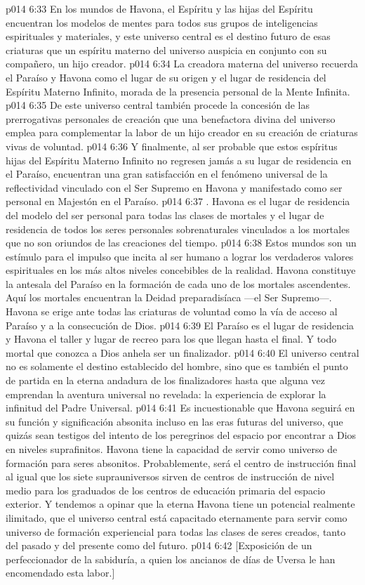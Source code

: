 \vs p014 6:33 En los mundos de Havona, el Espíritu y las hijas del Espíritu encuentran los modelos de mentes para todos sus grupos de inteligencias espirituales y materiales, y este universo central es el destino futuro de esas criaturas que un espíritu materno del universo auspicia en conjunto con su compañero, un hijo creador.
\vs p014 6:34 La creadora materna del universo recuerda el Paraíso y Havona como el lugar de su origen y el lugar de residencia del Espíritu Materno Infinito, morada de la presencia personal de la Mente Infinita.
\vs p014 6:35 De este universo central también procede la concesión de las prerrogativas personales de creación que una benefactora divina del universo emplea para complementar la labor de un hijo creador en su creación de criaturas vivas de voluntad.
\vs p014 6:36 Y finalmente, al ser probable que estos espíritus hijas del Espíritu Materno Infinito no regresen jamás a su lugar de residencia en el Paraíso, encuentran una gran satisfacción en el fenómeno universal de la reflectividad vinculado con el Ser Supremo en Havona y manifestado como ser personal en Majestón en el Paraíso.
\vs p014 6:37 . Havona es el lugar de residencia del modelo del ser personal para todas las clases de mortales y el lugar de residencia de todos los seres personales sobrenaturales vinculados a los mortales que no son oriundos de las creaciones del tiempo.
\vs p014 6:38 Estos mundos son un estímulo para el impulso que incita al ser humano a lograr los verdaderos valores espirituales en los más altos niveles concebibles de la realidad. Havona constituye la antesala del Paraíso en la formación de cada uno de los mortales ascendentes. Aquí los mortales encuentran la Deidad preparadisíaca ---el Ser Supremo---. Havona se erige ante todas las criaturas de voluntad como la vía de acceso al Paraíso y a la consecución de Dios.
\vs p014 6:39 El Paraíso es el lugar de residencia y Havona el taller y lugar de recreo para los que llegan hasta el final. Y todo mortal que conozca a Dios anhela ser un finalizador.
\vs p014 6:40 El universo central no es solamente el destino establecido del hombre, sino que es también el punto de partida en la eterna andadura de los finalizadores hasta que alguna vez emprendan la aventura universal no revelada: la experiencia de explorar la infinitud del Padre Universal.
\vs p014 6:41 \pc Es incuestionable que Havona seguirá en su función y significación absonita incluso en las eras futuras del universo, que quizás sean testigos del intento de los peregrinos del espacio por encontrar a Dios en niveles suprafinitos. Havona tiene la capacidad de servir como universo de formación para seres absonitos. Probablemente, será el centro de instrucción final al igual que los siete suprauniversos sirven de centros de instrucción de nivel medio para los graduados de los centros de educación primaria del espacio exterior. Y tendemos a opinar que la eterna Havona tiene un potencial realmente ilimitado, que el universo central está capacitado eternamente para servir como universo de formación experiencial para todas las clases de seres creados, tanto del pasado y del presente como del futuro.
\vsetoff
\vs p014 6:42 [Exposición de un perfeccionador de la sabiduría, a quien los ancianos de días de Uversa le han encomendado esta labor.]
